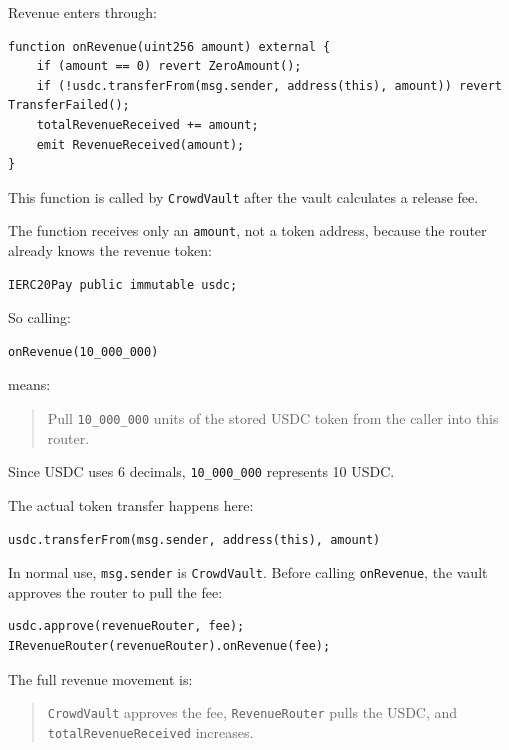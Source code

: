 \documentclass[11pt,a4paper]{article}
\begin{document}
Revenue enters through:

\begin{lstlisting}
function onRevenue(uint256 amount) external {
    if (amount == 0) revert ZeroAmount();
    if (!usdc.transferFrom(msg.sender, address(this), amount)) revert TransferFailed();
    totalRevenueReceived += amount;
    emit RevenueReceived(amount);
}
\end{lstlisting}

This function is called by \texttt{CrowdVault} after the vault calculates a release fee.

The function receives only an \texttt{amount}, not a token address, because the router already knows the revenue token:

\begin{lstlisting}
IERC20Pay public immutable usdc;
\end{lstlisting}

So calling:

\begin{lstlisting}
onRevenue(10_000_000)
\end{lstlisting}

means:

\begin{quote}
Pull \texttt{10\_000\_000} units of the stored USDC token from the caller into this router.
\end{quote}

Since USDC uses 6 decimals, \texttt{10\_000\_000} represents 10 USDC.

The actual token transfer happens here:

\begin{lstlisting}
usdc.transferFrom(msg.sender, address(this), amount)
\end{lstlisting}

In normal use, \texttt{msg.sender} is \texttt{CrowdVault}. Before calling \texttt{onRevenue}, the vault approves the router to pull the fee:

\begin{lstlisting}
usdc.approve(revenueRouter, fee);
IRevenueRouter(revenueRouter).onRevenue(fee);
\end{lstlisting}

The full revenue movement is:

\begin{quote}
\texttt{CrowdVault} approves the fee, \texttt{RevenueRouter} pulls the USDC, and \texttt{totalRevenueReceived} increases.
\end{quote}
\end{document}
